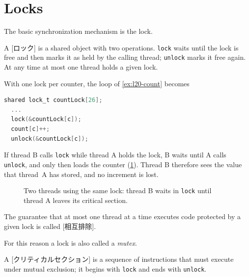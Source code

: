 \documentclass[../main.tex]{subfiles}
\begin{document}
\section{Locks}
\label{sec:l20-locks}

The basic synchronization mechanism is the lock.

\begin{definition}[Lock]
  A [ロック] is a shared object with two operations.
  \texttt{lock} waits until the lock is free and then marks it as held by the
  calling thread; \texttt{unlock} marks it free again.  At any time at most
  one thread holds a given lock.
\end{definition}

With one lock per counter, the loop of \cref{ex:l20-count} becomes
\begin{lstlisting}[language=C, numbers=none, morekeywords={shared}]
shared lock_t countLock[26];
  ...
  lock(&countLock[c]);
  count[c]++;
  unlock(&countLock[c]);
\end{lstlisting}
If thread B calls \texttt{lock} while thread A holds the lock, B waits until
A calls \texttt{unlock}, and only then loads the counter
(\cref{fig:l20-lock-timing}).  Thread B therefore sees the value that
thread~A has stored, and no increment is lost.

\begin{figure}[htbp]
  \centering
  
  \caption{Two threads using the same lock: thread B waits in
    \texttt{lock} until thread A leaves its critical section.}
  \label{fig:l20-lock-timing}
\end{figure}

\begin{definition}
  The guarantee that at most one thread at a time executes code protected
  by a given lock is called [相互排除].
\end{definition}

For this reason a lock is also called a \emph{mutex}.

\begin{definition}
  A [クリティカルセクション] is a sequence of
  instructions that must execute under mutual exclusion; it begins with
  \texttt{lock} and ends with \texttt{unlock}.
\end{definition}
\end{document}
